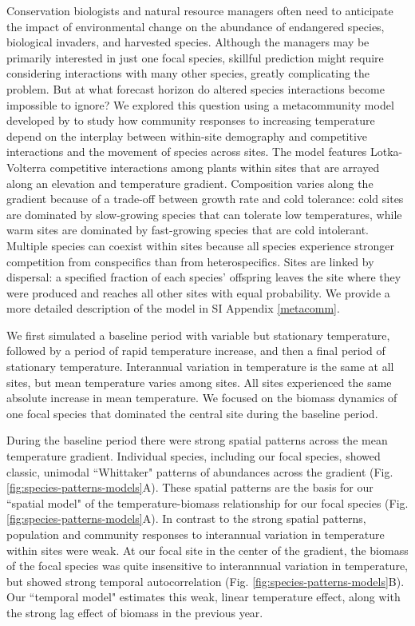 \documentclass[11pt]{article}
\begin{document}
Conservation biologists and natural resource managers often need to anticipate the impact of environmental change on the abundance of 
endangered species, biological invaders, and harvested species. Although the managers may be primarily interested in just one focal species, skillful prediction might require considering interactions with many other species, greatly complicating the problem. But at what forecast horizon do altered species interactions become impossible to ignore? We explored this question using a metacommunity model developed by \cite{alexander_lags_2018} to study how community responses to increasing temperature depend on the interplay between within-site demography and competitive interactions and the movement of species across sites. The model features Lotka-Volterra competitive interactions among plants within sites that are arrayed along an elevation and temperature gradient. Composition varies along the gradient because of a trade-off between growth rate and cold tolerance: cold sites are dominated by slow-growing species that can tolerate low temperatures, while warm sites are dominated by  fast-growing species that are cold intolerant. Multiple species can coexist within sites because all species experience stronger competition from conspecifics than from heterospecifics. Sites are linked by dispersal: a specified fraction of each species' offspring leaves the site where they were produced and reaches all other sites with equal probability. We provide a more detailed description of the model in SI Appendix \ref{metacomm}.

We first simulated a baseline period with variable but stationary temperature, followed by a period of rapid temperature increase, and then a final period of stationary temperature. Interannual variation in temperature is the same at all sites, but mean temperature varies among sites. All sites experienced the same absolute increase in mean temperature. We focused on the biomass dynamics of one focal species that dominated the central site during the baseline period.

During the baseline period there were strong spatial patterns across the mean temperature gradient. 
Individual species, including our focal species, showed classic, unimodal ``Whittaker" patterns of abundances across the gradient (Fig. \ref{fig:species-patterns-models}A).
These spatial patterns are the basis for our ``spatial model" of the temperature-biomass relationship for our focal species (Fig. \ref{fig:species-patterns-models}A). 
In contrast to the strong spatial patterns, population and community responses to interannual variation in temperature within sites were weak.
At our focal site in the center of the gradient, the biomass of the focal species was quite insensitive to interannnual variation in temperature, but showed strong temporal autocorrelation (Fig. \ref{fig:species-patterns-models}B). Our ``temporal model" estimates this weak, linear temperature effect, along with the strong lag effect of biomass in the previous year. 
\end{document}
